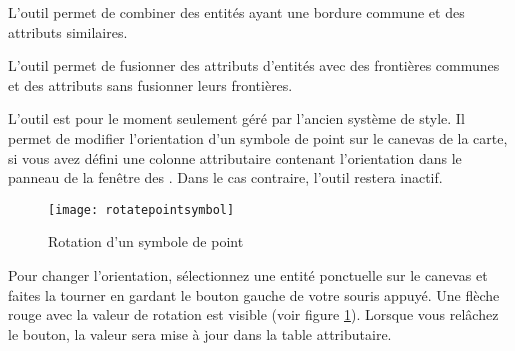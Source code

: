 L'outil  permet de combiner des entités ayant une bordure commune et des attributs similaires.


L'outil  
permet de fusionner des attributs d'entités avec des frontières communes et des 
attributs sans fusionner leurs frontières.  


L'outil  est 
pour le moment seulement géré par l'ancien système de style. Il permet de 
modifier l'orientation d'un symbole de point sur le canevas de la carte, si vous 
avez défini une colonne attributaire contenant l'orientation dans le panneau 
 de la fenêtre des . Dans le cas 
contraire, l'outil restera inactif.

\begin{figure}[ht]
   \centering
   \texttt{[image: rotatepointsymbol]}
   \caption{Rotation d'un symbole de point \nixcaption}\label{fig:rotatepoint}
\end{figure}

Pour changer l'orientation, sélectionnez une entité ponctuelle sur le canevas et faites la tourner en gardant le bouton gauche de votre souris appuyé. Une flèche 
rouge avec la valeur de rotation est visible (voir figure \ref{fig:rotatepoint}). 
Lorsque vous relâchez le bouton, la valeur sera mise à jour dans la table 
attributaire.

